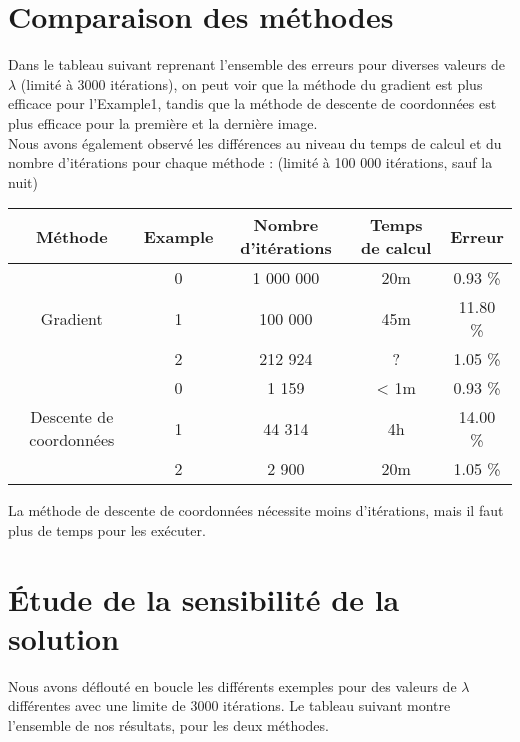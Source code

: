 \documentclass[12pt, a4paper]{report}
\begin{document}
\section{Comparaison des méthodes}
Dans le tableau suivant reprenant l'ensemble des erreurs pour diverses valeurs de $\lambda$ (limité à 3000 itérations), on peut voir que la méthode du gradient est plus efficace pour l'Example1, tandis que la méthode de descente de coordonnées est plus efficace pour la première et la dernière image. \\

Nous avons également observé les différences au niveau du temps de calcul et du nombre d'itérations pour chaque méthode : (limité à 100 000 itérations, sauf la nuit) \\
\begin{center}
\begin{tabular}{|c|c|c|c|c|}
\hline
Méthode & Example & Nombre d'itérations & Temps de calcul & Erreur \\
\hline
\multirow{3}{*}{Gradient} & 0 & 1 000 000 & 20m & 0.93 \% \\
 & 1 & 100 000 & 45m & 11.80 \% \\
 & 2 & 212 924 & ? & 1.05 \% \\
\hline
\multirow{3}{*}{Descente de coordonnées} & 0 & 1 159 & < 1m & 0.93 \% \\
 & 1 & 44 314 & 4h & 14.00 \% \\
 & 2 & 2 900 & 20m & 1.05 \% \\
\hline
\end{tabular}
\end{center}

La méthode de descente de coordonnées nécessite moins d'itérations, mais il faut plus de temps pour les exécuter. \\


\section{Étude de la sensibilité de la solution}
Nous avons déflouté en boucle les différents exemples pour des valeurs de $\lambda$ différentes avec une limite de 3000 itérations. Le tableau suivant montre l'ensemble de nos résultats, pour les deux méthodes. \\
\end{document}
